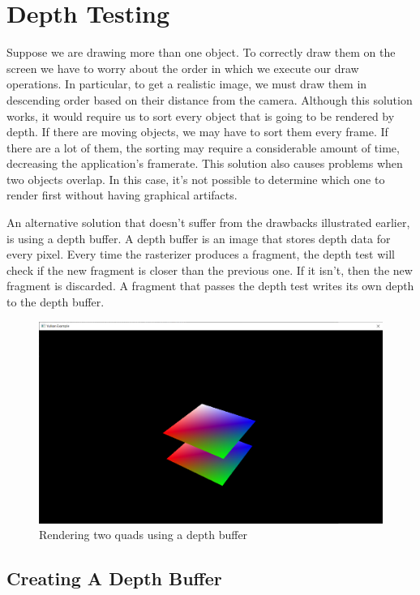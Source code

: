 \chapter{Depth Testing}

Suppose we are drawing more than one object.
To correctly draw them on the screen we have to worry about
the order in which we execute our draw operations.
In particular, to get a realistic image, we must draw
them in descending order based on their distance from the camera.
Although this solution works, it would require us to sort
every object that is going to be rendered by depth.
If there are moving objects, we may have to sort them every frame.
If there are a lot of them, the sorting may require a considerable
amount of time, decreasing the application's framerate.
This solution also causes problems when two objects overlap.
In this case, it's not possible to determine which one
to render first without having graphical artifacts.

An alternative solution that doesn't suffer from the drawbacks
illustrated earlier, is using a depth buffer.
A depth buffer is an image that stores depth data for every pixel.
Every time the rasterizer produces a fragment, the depth test will
check if the new fragment is closer than the previous one.
If it isn't, then the new fragment is discarded.
A fragment that passes the depth test writes its own depth to the
depth buffer.

\begin{figure}[ht]
    \centering
    \includegraphics[scale=0.20]{images/ChDepthTesting/DepthTesting.png}
    \caption{Rendering two quads using a depth buffer}
    \label{fig::DepthTesting}
\end{figure}

\section{Creating A Depth Buffer}

